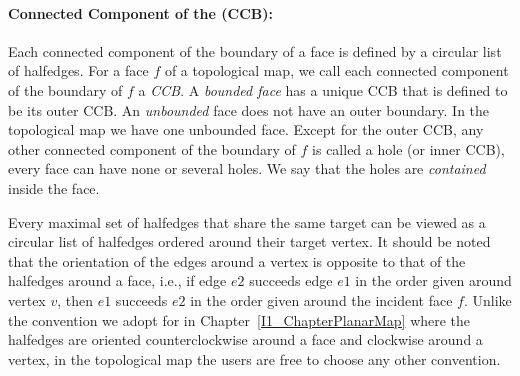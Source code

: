 \paragraph{Connected Component of the  (CCB):}
Each connected component of the boundary of a face is %
defined by a
circular list of halfedges. 
For a face $f$ of a topological map, 
we call each
connected component of the boundary of $f$ a {\em CCB}.
A {\em bounded face} has a
unique CCB that is defined to be
its outer CCB. An
{\em unbounded\/} face does not have an outer boundary.
In the topological map we have one unbounded face.
Except for the outer CCB, any other
connected component of the boundary of $f$ is called a hole (or inner CCB),
every face can have none
or several holes.
We say that the holes are {\em contained\/} inside
the face.

Every maximal set of halfedges that share the same target can be viewed 
as a circular list of halfedges ordered %
around their target vertex.
It should be noted that the orientation of the edges around a vertex is 
opposite to that of the halfedges around a face, i.e., if edge $e2$
succeeds edge $e1$ in the order given around vertex $v$, then $e1$
succeeds $e2$ in the order given around the incident face $f$.
Unlike the convention we adopt
for  in Chapter~\ref{I1_ChapterPlanarMap} where the halfedges
are oriented counterclockwise around a face and clockwise around a vertex,
in the topological map the users are free to choose any other convention.


